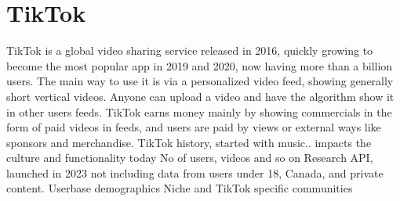 \section{TikTok}

TikTok is a global video sharing service released in 2016, quickly growing to become the most popular app in 2019 and 2020, now having more than a billion users. The main way to use it is via a personalized video feed, showing generally short vertical videos. Anyone can upload a video and have the algorithm show it in other users feeds. TikTok earns money mainly by showing commercials in the form of paid videos in feeds, and users are paid by views or external ways like sponsors and merchandise.
TikTok history, started with music.. impacts the culture and functionality today
No of users, videos and so on
Research API, launched in 2023 not including data from users under 18, Canada, and private content. 
Userbase demographics
Niche and TikTok specific communities


